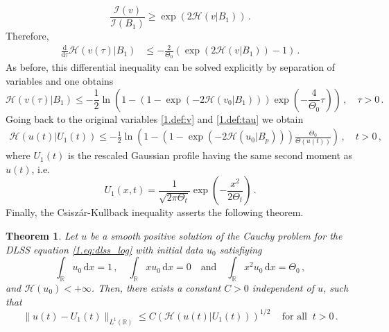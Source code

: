 \documentclass[12pt]{amsart}
\newcommand{\R}{{\mathbb R}}
\newcommand{\dd}{{\mathrm{d}}}
\newcommand{\M}{\Theta}
\newcommand{\I}{\mathcal{I}}
\newcommand{\entropy}{\mathcal{H}}
\theoremstyle{plain}
\newtheorem{theorem}{Theorem}[section]
\theoremstyle{definition}
\theoremstyle{remark}
\begin{document}
\begin{equation*}
    \frac{\I(v)}{\I(B_1)}\geq \exp(2\entropy(v|B_1))\,.
\end{equation*} 
Therefore,
\begin{align*}%
    \frac{\dd}{\dd \tau}\entropy(v(\tau)|B_1) &\leq -\frac{2}{\M_0}\left(\exp(2\entropy(v|B_1)) - 1\right)\,.
\end{align*}
As before, this differential inequality can be solved explicitly by separation of variables and one obtains
\begin{equation*}
    \entropy(v(\tau)|B_1) \leq -\frac{1}{2}\ln\left(1 - \left(1 - \exp({-2\entropy(v_0|B_1)})\right)\exp\left(-\frac{4}{\M_0}\tau\right)\right)\,,\quad \tau > 0\,.
\end{equation*}
Going back to the original variables \eqref{1.def:v} and \eqref{1.def:tau} we obtain
    \begin{align*}
        \entropy(u(t)|U_{1}(t)) \leq  -\frac{1}{2}\ln\left(1 - \left(1 - \exp({-2\entropy(u_0|B_p)})\right)\frac{\M_0}{\M(u(t))}\right)\,,\quad t > 0\,,
    \end{align*}
    where $U_{1}(t)$ is the rescaled Gaussian profile having the same second moment as $u(t)$, i.e.
    \begin{equation*}%
        U_1(x,t) = \frac{1}{\sqrt{2\pi\M_t}}\exp\left(-\frac{x^2}{2\M_t}\right)\,.
    \end{equation*}
Finally, the Csisz\'ar-Kullback inequality asserts the following theorem.
\begin{theorem}\label{3.tm_dlss}
   Let $u$ be a smooth positive solution of the Cauchy problem for the DLSS equation \eqref{1.eq:dlss_log} with initial data $u_0$ satisfiying
    \begin{equation*}
        \int_\R u_0\,\dd x = 1\,,\quad \int_\R  xu_0\,\dd x = 0\quad \text{and}\quad \int_\R x^2u_0\,\dd x = \M_0\,,
    \end{equation*}
    and $\entropy(u_0) < +\infty$. Then, there exists a constant $C>0$ independent of $u$, such that
    \begin{equation*}
        \|u(t) - U_1(t)\|_{L^1(\R)} \leq C\left(\entropy(u(t)|U_{1}(t))\right)^{1/2}\,\quad \text{for all }\ t>0\,.
    \end{equation*}
\end{theorem}




\end{document}
